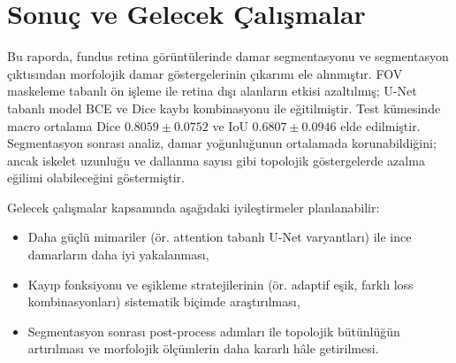 \section{Sonuç ve Gelecek Çalışmalar}
Bu raporda, fundus retina görüntülerinde damar segmentasyonu ve segmentasyon çıktısından morfolojik damar göstergelerinin çıkarımı ele alınmıştır. FOV maskeleme tabanlı ön işleme ile retina dışı alanların etkisi azaltılmış; U-Net tabanlı model BCE ve Dice kaybı kombinasyonu ile eğitilmiştir. Test kümesinde macro ortalama Dice $0.8059\pm0.0752$ ve IoU $0.6807\pm0.0946$ elde edilmiştir. Segmentasyon sonrası analiz, damar yoğunluğunun ortalamada korunabildiğini; ancak iskelet uzunluğu ve dallanma sayısı gibi topolojik göstergelerde azalma eğilimi olabileceğini göstermiştir.

Gelecek çalışmalar kapsamında aşağıdaki iyileştirmeler planlanabilir:
\begin{itemize}
    \item Daha güçlü mimariler (ör. attention tabanlı U-Net varyantları) ile ince damarların daha iyi yakalanması,
    \item Kayıp fonksiyonu ve eşikleme stratejilerinin (ör. adaptif eşik, farklı loss kombinasyonları) sistematik biçimde araştırılması,
    \item Segmentasyon sonrası post-process adımları ile topolojik bütünlüğün artırılması ve morfolojik ölçümlerin daha kararlı hâle getirilmesi.
\end{itemize}
